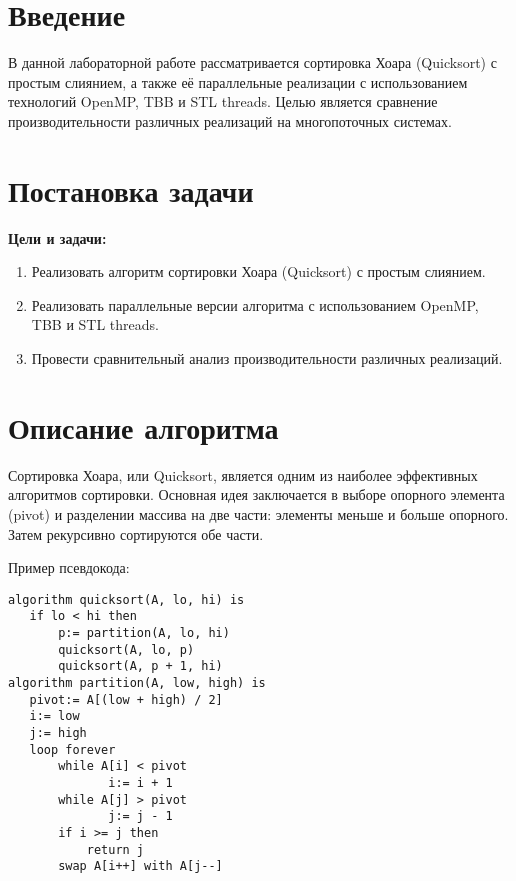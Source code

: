 \documentclass{report}
\begin{document}
\setcounter{page}{2}

\tableofcontents
\newpage

\section*{Введение}
\par В данной лабораторной работе рассматривается сортировка Хоара (Quicksort) с простым слиянием, а также её параллельные реализации с использованием технологий OpenMP, TBB и STL threads. Целью является сравнение производительности различных реализаций на многопоточных системах.

\newpage

\section*{Постановка задачи}
\par \textbf{Цели и задачи:}
\begin{enumerate}
    \item Реализовать алгоритм сортировки Хоара (Quicksort) с простым слиянием.
    \item Реализовать параллельные версии алгоритма с использованием OpenMP, TBB и STL threads.
    \item Провести сравнительный анализ производительности различных реализаций.
\end{enumerate}

\newpage

\section*{Описание алгоритма}
\par Сортировка Хоара, или Quicksort, является одним из наиболее эффективных алгоритмов сортировки. Основная идея заключается в выборе опорного элемента (pivot) и разделении массива на две части: элементы меньше и больше опорного. Затем рекурсивно сортируются обе части.

\par Пример псевдокода:
\begin{lstlisting}
algorithm quicksort(A, lo, hi) is
   if lo < hi then
       p:= partition(A, lo, hi)
       quicksort(A, lo, p)
       quicksort(A, p + 1, hi)
algorithm partition(A, low, high) is
   pivot:= A[(low + high) / 2]
   i:= low
   j:= high
   loop forever
       while A[i] < pivot 
              i:= i + 1
       while A[j] > pivot
              j:= j - 1
       if i >= j then
           return j
       swap A[i++] with A[j--]
\end{lstlisting}
\end{document}
